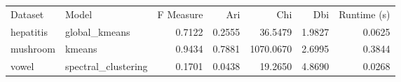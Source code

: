 \begin{tabular}{llrrrrr}
Dataset & Model & F Measure & Ari & Chi & Dbi & Runtime (s) \\
hepatitis & global_kmeans & 0.7122 & 0.2555 & 36.5479 & 1.9827 & 0.0625 \\
mushroom & kmeans & 0.9434 & 0.7881 & 1070.0670 & 2.6995 & 0.3844 \\
vowel & spectral_clustering & 0.1701 & 0.0438 & 19.2650 & 4.8690 & 0.0268 \\
\end{tabular}
